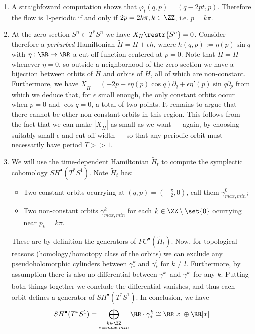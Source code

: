 
 
\begin{enumerate}
    \item A straighfoward computation shows that  $\varphi_t(q,p)=(q-2pt,p)$. Therefore the flow is 1-periodic if and only if
    $2p=2k\pi, k\in \ZZ$, i.e. $p=k\pi$.
    \item At the zero-section $S^n\subset T^*S^n$ we have $X_H\restr{S^n}=0$. Consider therefore a {\it perturbed} Hamiltonian $\tilde H=H+\epsilon h$, where $h(q,p):=\eta(p)\sin q$ with $\eta:\RR\to \RR$  a cut-off function centered at $p=0$. Note that $\tilde H=H$ whenever $\eta=0$, so outside a neighborhood of the zero-section we have a bijection between orbits of $\tilde H$ and orbits of $H$, all of which are non-constant. Furthermore, we have $X_{\tilde H}=(-2p+\epsilon\eta(p)\cos q)\partial_q +\epsilon\eta'(p)\sin q\partial_p$ from which we deduce that, for $\epsilon$ small enough, the only constant orbits occur when $p=0$ and $\cos q=0$, a total of two points. It remains to argue that there cannot be other non-constant orbits in this region. This follows from the fact that we can make $|X_{\tilde H}|$ as small as we want --- again, by choosing suitably small $\epsilon$ and cut-off width --- so that any periodic orbit must necessarily have period $T>>1$.
    
    \item We will use the time-dependent Hamiltonian $\tilde H_t$ to compute the symplectic cohomology $SH^\bullet(T^*S^1)$. Note $\tilde H_t$  has:
    \begin{itemize}
        \item Two constant orbits ocurrying at $(q,p)=\left(\pm \frac{\pi}{2},0\right)$, call them $\gamma^0_{max,min}$;
        \item Two non-constant orbits $\gamma_{max,min}^k$ for each $k\in \ZZ\setminus\set{0}$ ocurrying near $p_k=k\pi$.
    \end{itemize}
    These are by definition the generators of $FC^\bullet(\tilde H_t)$. Now, for topological reasons (homology/homotopy class of the orbits) we can exclude any pseudoholomorphic cylinders between $\gamma^k_*$ and $\gamma^l_*$ for $k\neq l$. Furthermore, by assumption there is also no differential between $\gamma^k_+$ and $\gamma^k_-$ for any $k$. Putting both things together we conclude the differential vanishes, and thus each orbit defines a generator of $SH^\bullet(T^*S^1)$. In conclusion, we have
    \[    SH^\bullet(T^*S^1)=\bigoplus_{\substack{k\in\ZZ \\ *=max,min}}\RR\cdot \gamma^k_*\cong \RR[x]\oplus\RR[x]\]
    

\end{enumerate}

